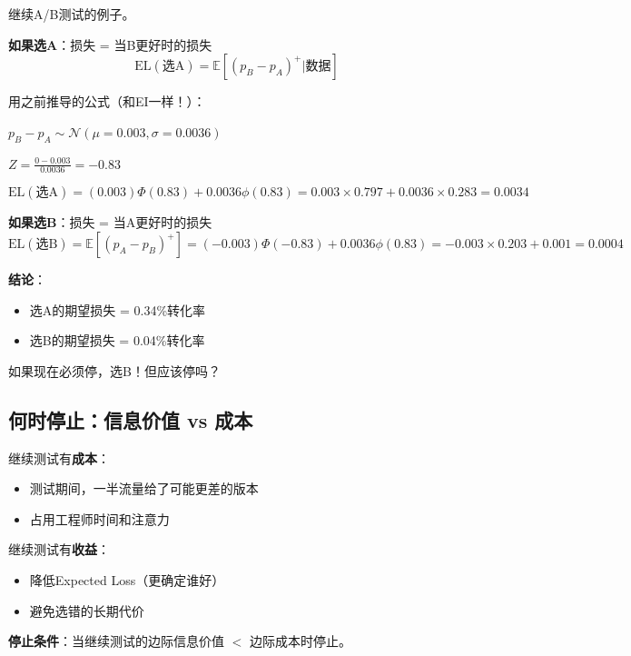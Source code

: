 \documentclass[11pt,a4paper]{article}
\theoremstyle{definition}
\begin{document}
\begin{calculation}
继续A/B测试的例子。

\textbf{如果选A}：损失 = 当B更好时的损失
\[
\text{EL}(\text{选A}) = \mathbb{E}[(p_B - p_A)^+ | \text{数据}]
\]

用之前推导的公式（和EI一样！）：

$p_B - p_A \sim \mathcal{N}(\mu = 0.003, \sigma = 0.0036)$

$Z = \frac{0 - 0.003}{0.0036} = -0.83$

\[
\text{EL}(\text{选A}) = (0.003)\Phi(0.83) + 0.0036\phi(0.83) = 0.003 \times 0.797 + 0.0036 \times 0.283 = 0.0034
\]

\textbf{如果选B}：损失 = 当A更好时的损失
\[
\text{EL}(\text{选B}) = \mathbb{E}[(p_A - p_B)^+] = (-0.003)\Phi(-0.83) + 0.0036\phi(0.83) = -0.003 \times 0.203 + 0.001 = 0.0004
\]

\textbf{结论}：
\begin{itemize}
    \item 选A的期望损失 = 0.34\%转化率
    \item 选B的期望损失 = 0.04\%转化率
\end{itemize}

如果现在必须停，选B！但应该停吗？
\end{calculation}

\subsection{何时停止：信息价值 vs 成本}

\begin{plainwords}[停止的决策框架]
继续测试有\textbf{成本}：
\begin{itemize}
    \item 测试期间，一半流量给了可能更差的版本
    \item 占用工程师时间和注意力
\end{itemize}

继续测试有\textbf{收益}：
\begin{itemize}
    \item 降低Expected Loss（更确定谁好）
    \item 避免选错的长期代价
\end{itemize}

\textbf{停止条件}：当继续测试的边际信息价值 $<$ 边际成本时停止。
\end{plainwords}
\end{document}
